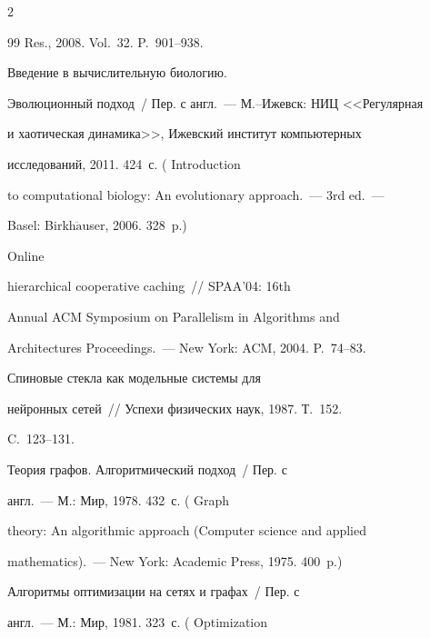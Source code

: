 \begin{multicols}{2}
{{\begin{thebibliography}{99}
Res., 2008. Vol.~32. P.~901--938.




 Введение в вычислительную биоло\-гию.


Эволюционный подход~/ Пер. с англ.~--- М.--Ижевск: НИЦ <<Регулярная


и хаотическая динамика>>, Ижевский институт компьютерных


исследований, 2011. 424~с. ( Introduction


to computational biology: An evolutionary approach.~--- 3rd ed.~---


Basel: Birkh$\ddot{\mbox{a}}$user, 2006. 328~p.)







 Online


hierarchical cooperative caching~// SPAA'04: 16th


Annual ACM Symposium on Parallelism in Algorithms and


Architectures Proceedings.~--- New York: ACM, 2004. P.~74--83.







 Спиновые стекла как модельные системы для


нейронных сетей~// Успехи физических наук, 1987. Т.~152.


C.~123--131.







 Теория графов. Алгоритмический подход~/ Пер. с


англ.~--- М.: Мир, 1978. 432~с. ( Graph


theory: An algorithmic approach (Computer science and applied


mathematics).~--- New York: Academic Press, 1975. 400~p.)







 Алгоритмы оптимизации на сетях и графах~/ Пер. с


англ.~--- М.: Мир, 1981. 323~с. ( Optimization



\end{thebibliography}}}
\end{multicols}
